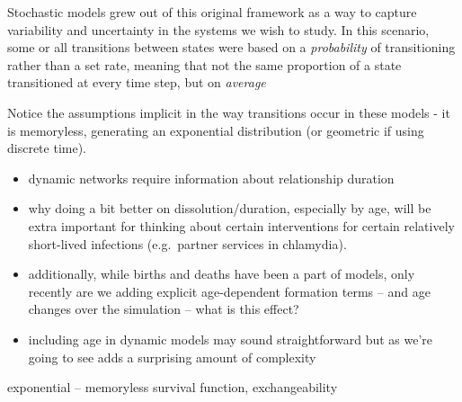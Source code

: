 \documentclass [11pt, proquest] {uwthesis}[2015/03/03]
\begin{document}
Stochastic models grew out of this original framework as a way to
capture variability and uncertainty in the systems we wish to study. In
this scenario, some or all transitions between states were based on a
\emph{probability} of transitioning rather than a set rate, meaning that
not the same proportion of a state transitioned at every time step, but
on \emph{average}

Notice the assumptions implicit in the way transitions occur in these
models - it is memoryless, generating an exponential distribution (or
geometric if using discrete time).
\begin{itemize}
\item
  dynamic networks require information about relationship duration
\item
  why doing a bit better on dissolution/duration, especially by age,
  will be extra important for thinking about certain interventions for
  certain relatively short-lived infections (e.g.~partner services in
  chlamydia).
\item
  additionally, while births and deaths have been a part of models, only
  recently are we adding explicit age-dependent formation terms -- and
  age changes over the simulation -- what is this effect?\\
\item
  including age in dynamic models may sound straightforward but as we're
  going to see adds a surprising amount of complexity
\end{itemize}
exponential -- memoryless survival function, exchangeability
\end{document}
